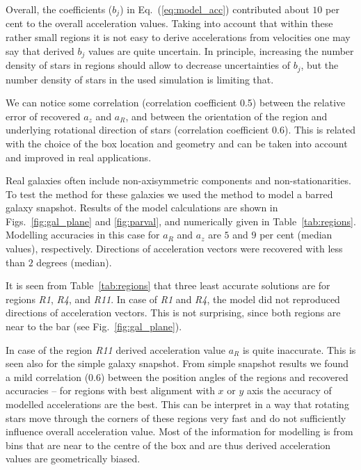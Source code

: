 \documentclass[fleqn,usenatbib]{mnras}
\begin{document}
Overall, the coefficients ($b_j$) in Eq.~(\ref{eq:model_acc}) contributed about $10$ per cent to the overall acceleration values. Taking into account that within these rather small regions it is not easy to derive accelerations from velocities one may say that derived $b_j$ values are quite uncertain. In principle, increasing the number density of stars in regions should allow to decrease uncertainties of $b_j$, but the number density of stars in the used simulation is limiting that. 

We can notice some correlation (correlation coefficient 0.5) between the relative error of recovered $a_z$ and $a_R$, and between the orientation of the region and underlying rotational direction of stars (correlation coefficient 0.6). This is related with the choice of the box location and geometry and can be taken into account and improved in real applications. 

Real galaxies often include non-axisymmetric components and non-stationarities. To test the method for these galaxies we used the method to model a barred galaxy snapshot. Results of the model calculations are shown in Figs.~\ref{fig:gal_plane} and \ref{fig:parval}, and numerically given in Table~\ref{tab:regions}. Modelling accuracies in this case for $a_R$ and $a_z$ are $5$ and $9$ per cent (median values), respectively. Directions of  acceleration vectors were recovered with less than $2$ degrees (median). 

It is seen from Table~\ref{tab:regions} that three least accurate solutions are for regions \textit{R1}, \textit{R4}, and \textit{R11}. In case of \textit{R1} and \textit{R4}, the model did not reproduced directions of acceleration vectors. This is not surprising, since both regions are near to the bar (see Fig.~\ref{fig:gal_plane}). 

In case of the region \textit{R11} derived acceleration value $a_R$ is quite inaccurate. This is seen also for the simple galaxy snapshot. From simple snapshot results we found a mild correlation ($0.6$) between the position angles of the regions and recovered accuracies -- for regions with best alignment with $x$ or $y$ axis the accuracy of modelled accelerations are the best. This can be interpret in a way that rotating stars move through the corners of these regions very fast and do not sufficiently influence overall acceleration value. Most of the information for modelling is from bins that are near to the centre of the box and are thus derived acceleration values are geometrically biased. 
\end{document}

